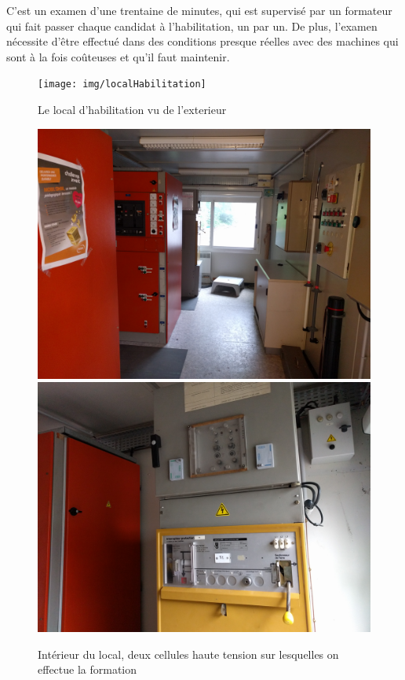 \documentclass[a4paper]{article}
\begin{document}
        C'est un examen d'une trentaine de minutes, qui est supervisé par un formateur qui fait passer chaque candidat à l'habilitation, un par un. De plus, l'examen nécessite d'être effectué dans des conditions presque réelles avec des machines qui sont à la fois coûteuses et qu'il faut maintenir. \\

        \begin{figure}[H]
            \centering
            \texttt{[image: img/localHabilitation]}
            \caption{Le local d'habilitation vu de l'exterieur}
        \end{figure}

        \begin{figure}[H]
            \centering
            \includegraphics[scale=0.05]{img/habilitation1}
            \includegraphics[scale=0.05]{img/habilitation2}
            \caption{Intérieur du local, deux cellules haute tension sur lesquelles on effectue la formation}
        \end{figure}
\end{document}
